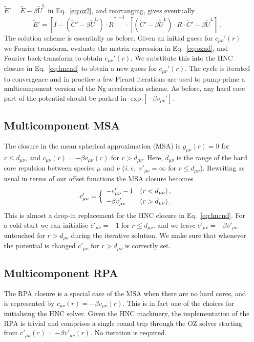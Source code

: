 \documentclass[12pt,a4paper]{article}
\newcommand{\latin}[1]{\emph{#1}}
\newcommand{\ie}{\latin{i.\,e.}}
\newcommand{\lr}{^{\mathrm{L}}}
\newcommand{\Eqref}[1]{Eq.~\eqref{#1}}
\begin{document}
${\tilde E}'={\tilde E}-\beta{\tilde U}\lr$ in \Eqref{eq:oz2}, and
rearranging, gives eventually
%
\begin{equation}
{\tilde E}'=[I-({\tilde C}'-\beta{\tilde U}\lr)\cdot R]^{-1}\cdot
[({\tilde C}'-\beta{\tilde U}\lr)\cdot R\cdot {\tilde C}'-\beta{\tilde
    U}\lr]\,.
\label{eq:oznd}
\end{equation}
%
The solution scheme is essentially as before.  Given an initial guess
for $c_{\mu\nu}'(r)$ we Fourier transform, evaluate the matrix
expression in \Eqref{eq:oznd}, and Fourier back-transform to obtain
$e_{\mu\nu}'(r)$.  We substitute this into the HNC closure in
\Eqref{eq:hncnd} to obtain a new guess for $c_{\mu\nu}'(r)$.  The
cycle is iterated to convergence and in practice a few Picard
iterations are used to pump-prime a multicomponent version of the Ng
acceleration scheme.  As before, any hard core part of the potential
should be parked in $\exp[-\beta v_{\mu\nu}']$.

\subsection{Multicomponent MSA}
%
The closure in the mean spherical approximation (MSA) is
$g_{\mu\nu}(r)=0$ for $r\le d_{\mu\nu}$, and $c_{\mu\nu}(r)= -\beta
v_{\mu\nu}(r)$ for $r> d_{\mu\nu}$.  Here, $d_{\mu\nu}$ is the range
of the hard core repulsion between species $\mu$ and $\nu$
(\ie\ $v'_{\mu\nu}=\infty$ for $r\le d_{\mu\nu}$).  Rewriting as usual
in terms of our offset functions the MSA closure becomes
%
\begin{equation}
  c'_{\mu\nu}=\Bigl\{\begin{array}{ll}
  -e'_{\mu\nu}-1 & (r<d_{\mu\nu})\,,\\[3pt]
  -\beta v'_{\mu\nu} & (r>d_{\mu\nu})\,.
  \end{array}
\end{equation}
%
This is almost a drop-in replacement for the HNC closure in
\Eqref{eq:hncnd}.  For a cold start we can initialise $c'_{\mu\nu}=-1$
for $r\le d_{\mu\nu}$, and we leave $c'_{\mu\nu}=-\beta v'_{\mu\nu}$
untouched for $r>d_{\mu\nu}$ during the iterative solution.  We make
sure that whenever the potential is changed $c'_{\mu\nu}$ for
$r>d_{\mu\nu}$ is correctly set.

\subsection{Multicomponent RPA}\label{sec:RPA}
%
The RPA closure is a special case of the MSA when there are no hard
cores, and is represented by $c_{\mu\nu}(r)=-\beta v_{\mu\nu}(r)$.
This is in fact one of the choices for initialising the HNC solver.
Given the HNC machinery, the implementation of the RPA is trivial and
comprises a single round trip through the OZ solver starting from
$c'_{\mu\nu}(r)=-\beta v'_{\mu\nu}(r)$.  No iteration is required.
\end{document}
